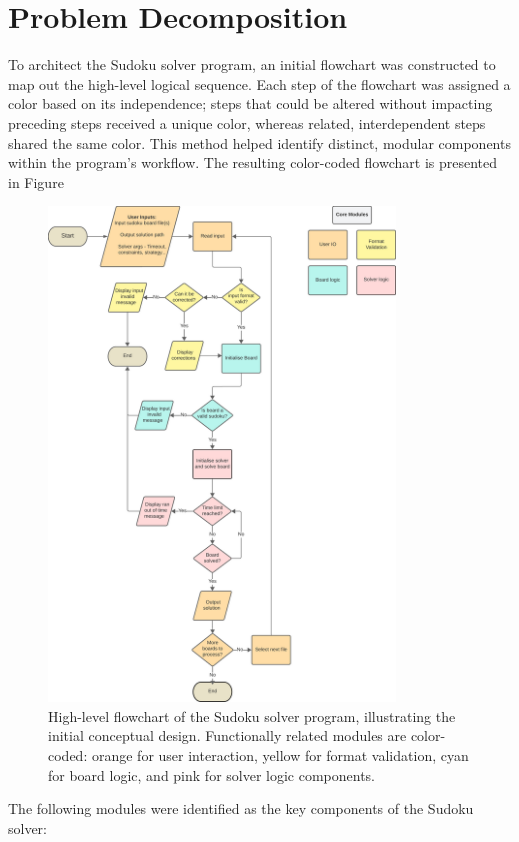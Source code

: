 \documentclass[11pt]{article}
\begin{document}
\section{Problem Decomposition}
To architect the Sudoku solver program, an initial flowchart was constructed to map out the high-level logical sequence. Each step of the flowchart was assigned a color based on its independence; steps that could be altered without impacting preceding steps received a unique color, whereas related, interdependent steps shared the same color. This method helped identify distinct, modular components within the program's workflow. The resulting color-coded flowchart is presented in Figure
\begin{figure}[H]
    \centering
    \includegraphics[width=0.82\textwidth]{figs/solver_flowchart.png}
    \caption{High-level flowchart of the Sudoku solver program, illustrating the initial conceptual design. Functionally related modules are color-coded: orange for user interaction, yellow for format validation, cyan for board logic, and pink for solver logic components.}
    \label{fig:solver_flowchart}
\end{figure}
The following modules were identified as the key components of the Sudoku solver:
\end{document}
